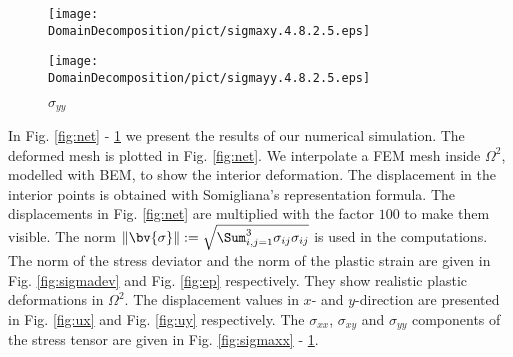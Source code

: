 \begin{figure}[h!]
   \begin{minipage}{7cm}
   \begin{center}
     \texttt{[image: \\DomainDecomposition/pict/sigmaxy.4.8.2.5.eps]}
\caption{ \label{fig:sigmaxy} $\sigma_{xy}$}
   \end{center}
   \end{minipage}
  \hspace*{10mm}
   \begin{minipage}{7cm}
   \begin{center}
     \texttt{[image: \\DomainDecomposition/pict/sigmayy.4.8.2.5.eps]}
\caption{ \label{fig:sigmayy} $\sigma_{yy}$}
   \end{center}
   \end{minipage}
\end{figure}
In Fig. \ref{fig:net} - \ref{fig:sigmayy} we present the results of our numerical simulation. The deformed mesh is plotted in Fig. \ref{fig:net}. We interpolate a FEM mesh inside $\Omega^2$, modelled with BEM, to show the interior deformation. The displacement in the interior points is obtained with Somigliana's representation formula. The displacements in Fig. \ref{fig:net} are multiplied with the factor $100$ to make them visible. The norm $\|\bv{\sigma}\| := \sqrt{\Sum_{i,j=1}^{3}\sigma_{ij}  \sigma_{ij}}$ is used in the computations. The norm of the stress deviator and the norm of the plastic strain are given in Fig. \ref{fig:sigmadev} and Fig. \ref{fig:ep} respectively. They show realistic plastic deformations in $\Omega^2$. The displacement values in $x$- and $y$-direction are presented in Fig. \ref{fig:ux} and Fig. \ref{fig:uy} respectively. The $\sigma_{xx}$, $\sigma_{xy}$ and $\sigma_{yy}$ components of the stress tensor are given in Fig. \ref{fig:sigmaxx} - \ref{fig:sigmayy}.


